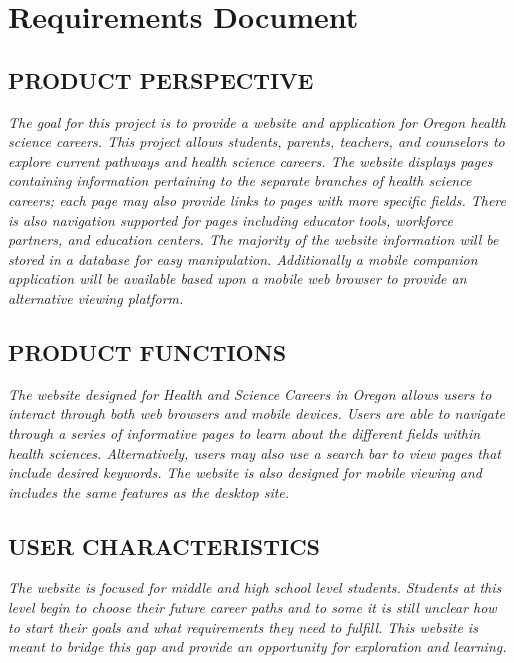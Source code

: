 \documentclass[twoside,letterpaper]{article}
\begin{document}
{%

\bigskip


\clearpage\section[Requirements Document]{\rmfamily\bfseries\color{black}
Requirements Document}


\subsection[PRODUCT
PERSPECTIVE]{\rmfamily\bfseries\color{black}
PRODUCT PERSPECTIVE}
{\itshape\color{black}
{The goal for this project is to provide a website and application for Oregon health science careers. This project allows students, parents, teachers, and counselors to explore current pathways and health science careers. The website displays pages containing information pertaining to the separate branches of health science careers; each page may also provide links to pages with more specific fields. There is also navigation supported for pages including educator tools, workforce partners, and education centers. The majority of the website information will be stored in a database for easy manipulation. Additionally a mobile companion application will be available based upon a mobile web browser to provide an alternative viewing platform.}



\subsection[PRODUCT
FUNCTIONS]{\rmfamily\bfseries\color{black}
PRODUCT FUNCTIONS}
{\itshape\color{black}
The website designed for Health and Science Careers in Oregon allows users to interact through both web browsers and mobile devices. Users are able to navigate through a series of informative pages to learn about the different fields within health sciences. Alternatively, users may also use a search bar to view pages that include desired keywords. The website is also designed for mobile viewing and includes the same features as the desktop site.}


\subsection[USER
CHARACTERISTICS]{\rmfamily\bfseries\color{black}
USER CHARACTERISTICS}
{\itshape\color{black}
The website is focused for middle and high school level students. Students at this level begin to choose their future career paths and to some it is still unclear how to start their goals and what requirements they need to fulfill. This website is meant to bridge this gap and provide an opportunity for exploration and learning. }

}}
\end{document}
